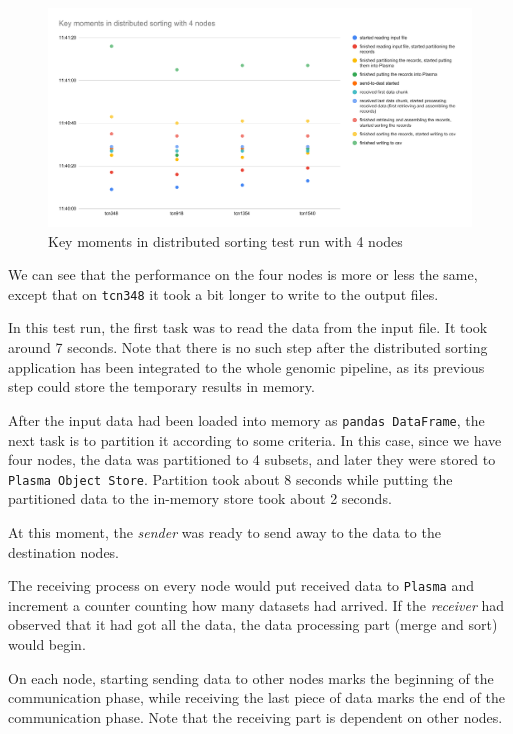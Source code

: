 \documentclass{article}
\begin{document}
\begin{figure}[h!]
    \caption{Key moments in distributed sorting test run with 4 nodes}
    \centering
      \includegraphics[width=1.4\textwidth]{key_moments}
  \end{figure}

We can see that the performance on the four nodes is more or less the same, except that on \texttt{tcn348} it took a bit longer to write to the output files.

In this test run, the first task was to read the data from the input file.
It took around 7 seconds.
Note that there is no such step after the distributed sorting application has been integrated to the whole genomic pipeline,
as its previous step could store the temporary results in memory.

After the input data had been loaded into memory as \texttt{pandas DataFrame}, the next task is to partition it according to some criteria.
In this case, since we have four nodes, the data was partitioned to 4 subsets, and later they were stored to \texttt{Plasma Object Store}.
Partition took about 8 seconds while putting the partitioned data to the in-memory store took about 2 seconds.

At this moment, the \textit{sender} was ready to send away to the data to the destination nodes.

The receiving process on every node would put received data to \texttt{Plasma} and increment a counter counting how many datasets had arrived.
If the \textit{receiver} had observed that it had got all the data, the data processing part (merge and sort) would begin.

On each node, starting sending data to other nodes marks the beginning of the communication phase, while receiving the last piece of data marks the end of the communication phase.
Note that the receiving part is dependent on other nodes.
\end{document}
